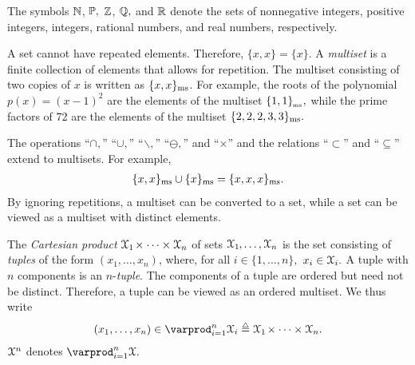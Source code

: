 The symbols ${\mathbb N}$, ${\mathbb P},$ ${\mathbb Z}$, ${\mathbb Q},$ and ${\mathbb R}$ denote the
\label{BBNsym}%
\label{BBPsym}%
\label{BBZsym}%
\label{BBQsym}%
\label{BBRsym}%
%
%
%
%
%
sets of nonnegative integers, positive integers, integers, rational numbers, and real numbers,
respectively.





A set cannot have repeated elements.
Therefore, $\{x,x\}=\{x\}.$
%
A {\it multiset}
%
is a finite collection of elements that allows for repetition.  The
multiset consisting of two copies of $x$ is written as
\label{multisetsym}%
$\{x,x\}_{{\rm {ms}}}$.
For example, the roots of the polynomial $p(x) = (x-1)^2$ are the elements of the multiset $\{1,1\}_{\mspace{-1mu}_{\rm {ms}}},$
while the prime factors of 72 are the elements of the multiset $\{2,2,2,3,3\}_{\rm {ms}}.$

The operations ``$\cap,$'' ``$\cup,$''
``$\mspace{1mu}\backslash,$'' ``$\ominus,$'' and ``$\times$'' and the relations ``$\subset$''
and ``$\subseteq$'' extend to multisets.
For example,
\begin{align}
\{x,x\}_{{\rm {ms}}}\cup\{x\}_{{\rm {ms}}}
=\{x,x,x\}_{{\rm {ms}}}.\end{align}
By ignoring
repetitions, a multiset can be converted to a set, while a set can
be viewed as  a multiset with distinct elements.

The {\it Cartesian product}
%
${\mathcal X}_1\mspace{-2mu} \times\cdots \times {\mathcal X}_n$ of sets
${\mathcal X}_1\mspace{-1mu},\ldots,{\mathcal X}_n$ is the set consisting of {\it
tuples}
%
\label{tuplesym}%
of the form $(x_1,\ldots, x_n)$, where, for all $i\in\{1,\ldots,n\},$ $x_i\in {\mathcal X}_i.$
A tuple with $n$ components is an $n$-{\it tuple}.
%
The components of a tuple are ordered but need not be distinct.  Therefore, a tuple can be viewed as an ordered multiset.
We thus write
%
\begin{align}
(x_1,\ldots, x_n)\in{\textstyle\varprod_{i=1}^n} \SX_i \isdef \SX_1\mspace{-2mu} \times\cdots \times \SX_n.
\end{align}
%
${\mathcal X}^n$ denotes $\varprod_{i=1}^n \SX.$
\label{cartprodsym}%

